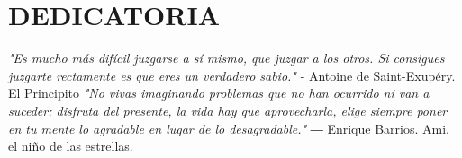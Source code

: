 \chapter*{DEDICATORIA}

\begin{flushright}
    \textit{
        "Es mucho más difícil juzgarse a sí mismo, que juzgar a los otros. Si consigues juzgarte rectamente es que eres un verdadero sabio."
    }
    - Antoine de Saint-Exupéry. El Principito
    \vspace{2cm}
    \textit{"No vivas imaginando problemas que no han ocurrido ni van a suceder; disfruta del presente, la vida hay que aprovecharla, elige siempre poner en tu mente lo agradable en lugar de lo desagradable."
    }
    ― Enrique Barrios. Ami, el niño de las estrellas.

\end{flushright}
